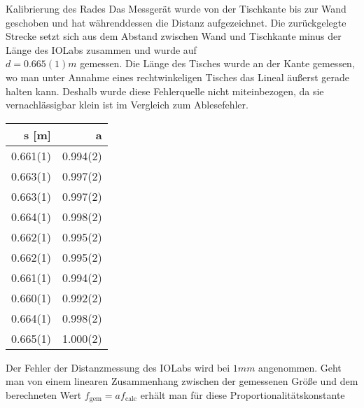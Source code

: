 \documentclass{alex_gp}
\begin{document}
\renewcommand{\labelenumi}{\alph{enumi})}

\begin{mybox}{Kalibrierung des Rades}
	Das Messgerät wurde von der Tischkante bis zur Wand geschoben und hat währenddessen die Distanz aufgezeichnet. Die zurückgelegte Strecke setzt sich aus dem Abstand zwischen Wand und Tischkante minus der Länge des IOLabs \footnotemark[1] zusammen und wurde auf \\ \( d = 0.665(1) \unit{m} \) gemessen. Die Länge des Tisches wurde an der Kante gemessen, wo man unter Annahme eines rechtwinkeligen Tisches das Lineal äußerst gerade halten kann. Deshalb wurde diese Fehlerquelle nicht miteinbezogen, da sie vernachlässigbar klein ist im Vergleich zum Ablesefehler.\\
	
	\begin{vwcol}[widths={0.3, 0.7}, sep=.8cm, justify=flush,rule=0pt, indent=1em, lines=20] 
		\begin{minipage}[t][0cm][t]{0.3\textwidth}
			\hspace{0.5cm}
			\begin{tabular}{@{} rr @{}}\toprule
				s [m] & a \\ \midrule
				0.661(1) & 0.994(2) \\
				0.663(1) & 0.997(2) \\
				0.663(1) & 0.997(2) \\
				0.664(1) & 0.998(2) \\
				0.662(1) & 0.995(2) \\
				0.662(1) & 0.995(2) \\
				0.661(1) & 0.994(2) \\
				0.660(1) & 0.992(2) \\
				0.664(1) & 0.998(2) \\
				0.665(1) & 1.000(2) \\
				\bottomrule
			\end{tabular}
			\label{table:1}
		\end{minipage}%
		\newpage
		\begin{minipage}[t][0cm][t]{0.64\textwidth}
			Der Fehler der Distanzmessung des IOLabs wird bei \( 1 \unit{mm} \) angenommen. Geht man von einem linearen Zusammenhang zwischen der gemessenen Größe und dem berechneten Wert \( f_{\text{gem}} = a f_{\text{calc}} \) erhält man für diese Proportionalitätskonstante 
			\begin{equation}\label{eqn:a0}

\end{equation}
\end{minipage}
\end{vwcol}
\end{mybox}
\end{document}
